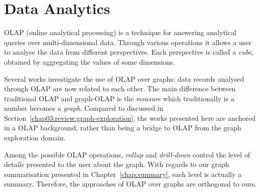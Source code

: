 
\section{Data Analytics}
\label{chap03:review:data-analytics}

OLAP (online analytical processing) is a technique for answering analytical queries over multi-dimensional data. Through various operations it allows a user to analyse the data from different perspectives. Each perspective is called a \emph{cube}, obtained by aggregating the values of some dimensions.

Several works investigate the use of OLAP over graphs: data records analysed through OLAP are now related to each other. The main difference between traditional OLAP and graph-OLAP is the \emph{measure} which traditionally is a number becomes a \emph{graph}. Compared to \cite{tian:sigmod:2008} discussed in Section~\ref{chap03:review:graph-exploration}, the works presented here are anchored in a OLAP background, rather than being a bridge to OLAP from the graph exploration domain.

Among the possible OLAP operations, \emph{rollup} and \emph{drill-down} control the level of details presented to the user about the graph. With regards to our graph summarisation presented in Chapter~\ref{chap:summary}, each level is actually a summary. Therefore, the approaches of OLAP over graphs are orthogonal to ours.\\

